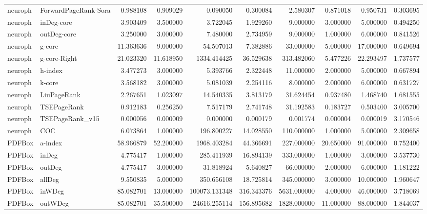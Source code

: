 \begin{tabular}{llrrrrrrrr}
neuroph & ForwardPageRank-Sora & 0.988108 & 0.909029 & 0.090050 & 0.300084 & 2.580307 & 0.871018 & 0.950731 & 0.303695 \\
neuroph & inDeg-core & 3.903409 & 3.500000 & 3.722045 & 1.929260 & 9.000000 & 3.000000 & 5.000000 & 0.494250 \\
neuroph & outDeg-core & 3.250000 & 3.000000 & 7.480000 & 2.734959 & 9.000000 & 1.000000 & 6.000000 & 0.841526 \\
neuroph & g-core & 11.363636 & 9.000000 & 54.507013 & 7.382886 & 33.000000 & 5.000000 & 17.000000 & 0.649694 \\
neuroph & g-core-Right & 21.023320 & 11.618950 & 1334.414425 & 36.529638 & 313.482060 & 5.477226 & 22.293497 & 1.737577 \\
neuroph & h-index & 3.477273 & 3.000000 & 5.393766 & 2.322448 & 11.000000 & 2.000000 & 5.000000 & 0.667894 \\
neuroph & k-core & 3.568182 & 3.000000 & 5.081039 & 2.254116 & 8.000000 & 2.000000 & 6.000000 & 0.631727 \\
neuroph & LiuPageRank & 2.267651 & 1.023097 & 14.540335 & 3.813179 & 31.624454 & 0.937480 & 1.468740 & 1.681555 \\
neuroph & TSEPageRank & 0.912183 & 0.256250 & 7.517179 & 2.741748 & 31.192583 & 0.183727 & 0.503400 & 3.005700 \\
neuroph & TSEPageRank_v15 & 0.000056 & 0.000009 & 0.000000 & 0.000179 & 0.001774 & 0.000004 & 0.000019 & 3.170546 \\
neuroph & COC & 6.073864 & 1.000000 & 196.800227 & 14.028550 & 110.000000 & 1.000000 & 5.000000 & 2.309658 \\
PDFBox & a-index & 58.966879 & 52.200000 & 1968.403284 & 44.366691 & 227.000000 & 20.650000 & 91.000000 & 0.752400 \\
PDFBox & inDeg & 4.775417 & 1.000000 & 285.411939 & 16.894139 & 333.000000 & 1.000000 & 3.000000 & 3.537730 \\
PDFBox & outDeg & 4.775417 & 3.000000 & 31.818924 & 5.640827 & 66.000000 & 2.000000 & 6.000000 & 1.181222 \\
PDFBox & allDeg & 9.550835 & 5.000000 & 350.656108 & 18.725814 & 345.000000 & 3.000000 & 10.000000 & 1.960647 \\
PDFBox & inWDeg & 85.082701 & 13.000000 & 100073.131348 & 316.343376 & 5631.000000 & 4.000000 & 46.000000 & 3.718069 \\
PDFBox & outWDeg & 85.082701 & 35.500000 & 24616.255114 & 156.895682 & 1828.000000 & 11.000000 & 88.000000 & 1.844037 \\

\end{tabular}
